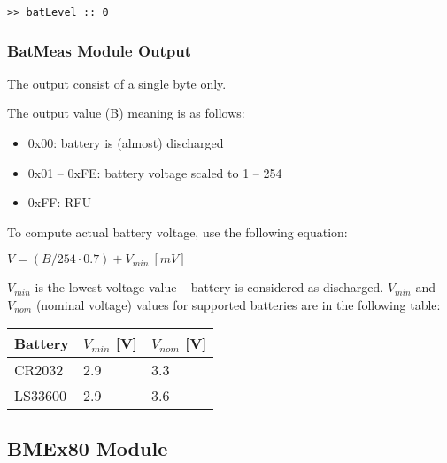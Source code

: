 \begin{docCodeExample}
\begin{verbatim}
>> batLevel :: 0
\end{verbatim}
\end{docCodeExample}

\subsubsection{BatMeas Module Output}
  The  output consist of a single byte only.
  
  The  output value (B) meaning is as follows:
  
  \begin{itemize}
    \item 0x00: battery is (almost) discharged
    \item 0x01 -- 0xFE: battery voltage scaled to 1 -- 254
    \item 0xFF: RFU
  \end{itemize}
  
  To compute actual battery voltage, use the following equation:
  
  $V = (B/254 \cdot 0.7) + V_{min} ~[mV]$
  
  $V_{min}$ is the lowest voltage value -- battery is considered as discharged. $V_{min}$ and $V_{nom}$ (nominal voltage) values for supported batteries are in the following table:
  
  \begin{table*}[!ht]
    \begin{tabular}{| p{3.5cm} | p{2cm} | p{2cm} |}
        \hline
        \rowcolor{SeaGreen3!30!} {\bf Battery} & $V_{min}$ [V] & $V_{nom}$ [V] \\
        \hline
        \hline
        CR2032 & 2.9 & 3.3 \\
        \hline
        LS33600 & 2.9 & 3.6 \\
        \hline
    \end{tabular}
    \label{tab:spec:AMR}
   \end{table*}
  

\clearpage
\subsection{BMEx80 Module}

